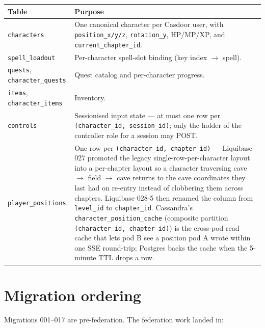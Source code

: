 \begin{tabularx}{\linewidth}{l X}
\toprule
\textbf{Table} & \textbf{Purpose} \\
\midrule
\texttt{characters} & One canonical character per Casdoor user, with
\texttt{position\_x/y/z}, \texttt{rotation\_y}, HP/MP/XP, and
\texttt{current\_chapter\_id}. \\
\texttt{spell\_loadout} & Per-character spell-slot binding (key index
$\rightarrow$ spell). \\
\texttt{quests}, \texttt{character\_quests} & Quest catalog and
per-character progress. \\
\texttt{items}, \texttt{character\_items} & Inventory. \\
\texttt{controls} & Sessionised input state — at most one row per
\texttt{(character\_id, session\_id)}; only the holder of the controller
role for a session may POST. \\
\texttt{player\_positions} & One row per
\texttt{(character\_id, chapter\_id)} — Liquibase 027 promoted the
legacy single-row-per-character layout into a per-chapter layout so a
character traversing cave $\rightarrow$ field $\rightarrow$ cave
returns to the cave coordinates they last had on re-entry instead of
clobbering them across chapters. Liquibase 028-5 then renamed the
column from \texttt{level\_id} to \texttt{chapter\_id}. Cassandra's
\texttt{character\_position\_cache} (composite partition
\texttt{(character\_id, chapter\_id)}) is the cross-pod read cache that
lets pod B see a position pod A wrote within one SSE round-trip;
Postgres backs the cache when the 5-minute TTL drops a row. \\
\bottomrule
\end{tabularx}

\section{Migration ordering}

Migrations 001–017 are pre-federation. The federation work landed in:

